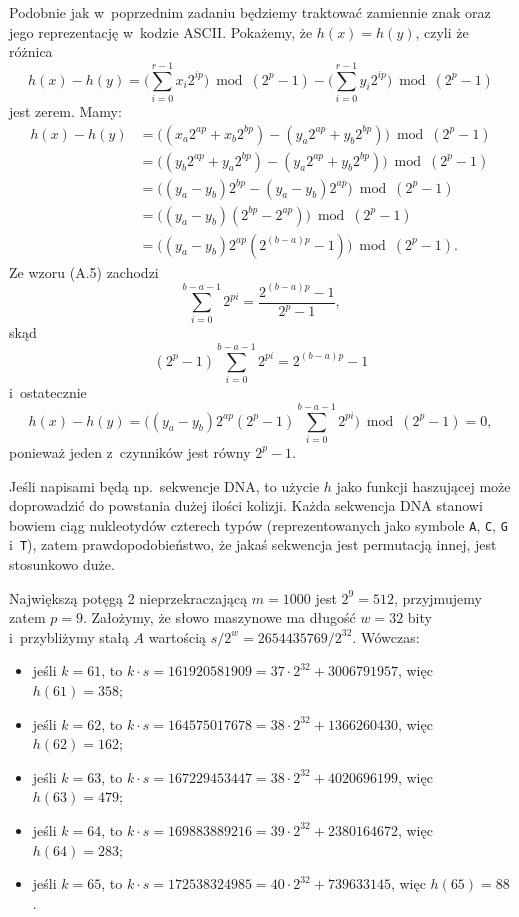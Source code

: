 Podobnie jak w~poprzednim zadaniu będziemy traktować zamiennie znak oraz jego reprezentację w~kodzie ASCII\@.
Pokażemy, że $h(x)=h(y)$, czyli że różnica
\[
	h(x)-h(y) = \biggl(\sum_{i=0}^{r-1}x_i2^{ip}\biggr)\bmod(2^p-1)-\biggl(\sum_{i=0}^{r-1}y_i2^{ip}\biggr)\bmod(2^p-1)
\]
jest zerem.
Mamy:
\begin{align*}
	h(x)-h(y) &= \bigl((x_a2^{ap}+x_b2^{bp})-(y_a2^{ap}+y_b2^{bp})\bigr)\bmod(2^p-1) \\
	&= \bigl((y_b2^{ap}+y_a2^{bp})-(y_a2^{ap}+y_b2^{bp})\bigr)\bmod(2^p-1) \\
	&= \bigl((y_a-y_b)2^{bp}-(y_a-y_b)2^{ap}\bigr)\bmod(2^p-1) \\
	&= \bigl((y_a-y_b)(2^{bp}-2^{ap})\bigr)\bmod(2^p-1) \\
	&= \bigl((y_a-y_b)2^{ap}(2^{(b-a)p}-1)\bigr)\bmod(2^p-1).
\end{align*}
Ze wzoru (A.5) zachodzi
\[
	\sum_{i=0}^{b-a-1}2^{pi} = \frac{2^{(b-a)p}-1}{2^p-1},
\]
skąd
\[
	(2^p-1)\sum_{i=0}^{b-a-1}2^{pi} = 2^{(b-a)p}-1
\]
i~ostatecznie
\[
	h(x)-h(y) = \biggl((y_a-y_b)2^{ap}(2^p-1)\sum_{i=0}^{b-a-1}2^{pi}\biggr)\bmod(2^p-1) = 0,
\]
ponieważ jeden z~czynników jest równy $2^p-1$.

Jeśli napisami będą np.\ sekwencje DNA, to użycie $h$ jako funkcji haszującej może doprowadzić do powstania dużej ilości kolizji.
Każda sekwencja DNA stanowi bowiem ciąg nukleotydów czterech typów (reprezentowanych jako symbole \texttt{A}, \texttt{C}, \texttt{G} i~\texttt{T}), zatem prawdopodobieństwo, że jakaś sekwencja jest permutacją innej, jest stosunkowo duże.

\exercise %
Największą potęgą 2 nieprzekraczającą $m=1000$ jest $2^9=512$, przyjmujemy zatem $p=9$.
Założymy, że słowo maszynowe ma długość $w=32$ bity i~przybliżymy stałą $A$ wartością $s/2^w=2654435769/2^{32}$.
Wówczas:
\begin{itemize}
	\item jeśli $k=61$, to $k\cdot s=161920581909=37\cdot2^{32}+3006791957$, więc $h(61)=358$;
	\item jeśli $k=62$, to $k\cdot s=164575017678=38\cdot2^{32}+1366260430$, więc $h(62)=162$;
	\item jeśli $k=63$, to $k\cdot s=167229453447=38\cdot2^{32}+4020696199$, więc $h(63)=479$;
	\item jeśli $k=64$, to $k\cdot s=169883889216=39\cdot2^{32}+2380164672$, więc $h(64)=283$;
	\item jeśli $k=65$, to $k\cdot s=172538324985=40\cdot2^{32}+739633145$, więc $h(65)=88$.
\end{itemize}

